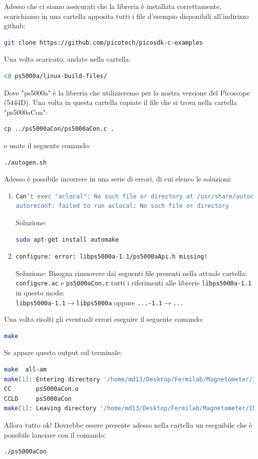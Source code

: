 \documentclass[a4paper]{article}
\begin{document}
Adesso che ci siamo assicurati che la libreria è installata correttamente, scarichiamo in una cartella apposita tutti i file d'esempio disponibili all'indirizzo github:
\begin{lstlisting}[language=bash]
git clone https://github.com/picotech/picosdk-c-examples
\end{lstlisting}
Una volta scaricato, andate nella cartella:
\begin{lstlisting}[language=bash]
cd ps5000a/linux-build-files/
\end{lstlisting}
Dove "ps5000a" è la libreria che utilizzeremo per la nostra versione del Picoscope (5444D). Una volta in questa cartella copiate il file che si trova nella cartella "ps5000aCon":
\begin{lstlisting}[language=bash]
cp ../ps5000aCon/ps5000aCon.c .
\end{lstlisting}
e usate il seguente comando:
\begin{lstlisting}[language=bash]
./autogen.sh
\end{lstlisting}
Adesso è possibile incorrere in una serie di errori, di cui elenco le soluzioni:
\begin{enumerate}
\item \begin{lstlisting}[language=bash]
Can't exec "aclocal": No such file or directory at /usr/share/autoconf/Autom4te/FileUtils.pm line 326.
autoreconf: failed to run aclocal: No such file or directory
\end{lstlisting}
Soluzione:
\begin{lstlisting}[language=bash]
sudo apt-get install automake
\end{lstlisting}

\item \begin{lstlisting}[language=bash]
configure: error: libps5000a-1.1/ps5000aApi.h missing!
\end{lstlisting}
Soluzione:
Bisogna rimuovere dai seguenti file presenti nella attuale cartella: \verb|configure.ac| e \verb|ps5000aCon.c| tutti i riferimenti alle librerie \verb|libps5000a-1.1| in questo modo:\\
\verb|libps5000a-1.1|$\to$\verb|libps5000a| oppure \verb|...-1.1|$\to$\verb|...|
\end{enumerate}
Una volta risolti gli eventuali errori eseguire il seguente comando:
\begin{lstlisting}[language=bash]
make
\end{lstlisting}
Se appare questo output sul terminale:
\begin{lstlisting}[language=bash]
make  all-am
make[1]: Entering directory '/home/md13/Desktop/Fermilab/Magnetometer/INO/picosdk_C/ps5000a/linux-build-files'
CC       ps5000aCon.o
CCLD     ps5000aCon
make[1]: Leaving directory '/home/md13/Desktop/Fermilab/Magnetometer/INO/picosdk_C/ps5000a/linux-build-files'
\end{lstlisting}
Allora tutto ok! Dovrebbe essere presente adesso nella cartella un eseguibile che è possibile lanciare con il comando:
\begin{lstlisting}[language=bash]
./ps5000aCon
\end{lstlisting}
\end{document}

